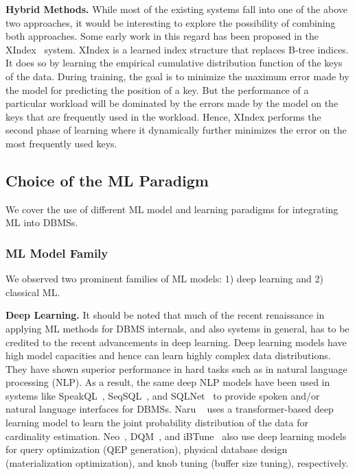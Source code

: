 \vspace{2mm}
\noindent \textbf{Hybrid Methods.} While most of the existing systems fall into one of the above two approaches, it would be interesting to explore the possibility of combining both approaches.
Some early work in this regard has been proposed in the XIndex~\cite{xindex} system.
XIndex is a learned index structure that replaces B-tree indices.
It does so by learning the empirical cumulative distribution function of the keys of the data.
During training, the goal is to minimize the maximum error made by the model for predicting the position of a key.
But the performance of a particular workload will be dominated by the errors made by the model on the keys that are frequently used in the workload.
Hence, XIndex performs the second phase of learning where it dynamically further minimizes the error on the most frequently used keys.


\subsection{Choice of the ML Paradigm}
We cover the use of different ML model and learning paradigms for integrating ML into DBMSs.

\subsubsection{ML Model Family}
We observed two prominent families of ML models: 1) deep learning and 2) classical ML.

\vspace{2mm}
\noindent \textbf{Deep Learning.} It should be noted that much of the recent renaissance in applying ML methods for DBMS internals, and also systems in general, has to be credited to the recent advancements in deep learning.
Deep learning models have high model capacities and hence can learn highly complex data distributions.
They have shown superior performance in hard tasks such as in natural language processing (NLP).
As a result, the same deep NLP models have been used in systems like SpeakQL~\cite{speakql}, SeqSQL~\cite{seq2sql}, and SQLNet~\cite{sqlnet} to provide spoken and/or natural language interfaces for DBMSs.
Naru ~\cite{naru} uses a transformer-based deep learning model to learn the joint probability distribution of the data for cardinality estimation.
Neo~\cite{neo}, DQM~\cite{dqm}, and iBTune~\cite{ibtune} also use deep learning models for query optimization (QEP generation), physical database design (materialization optimization), and knob tuning (buffer size tuning), respectively.

